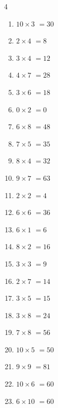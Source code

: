 \begin{multicols}{4}
\begin{enumerate}
  \item $10\times 3$
        $=30$

\columnbreak %

  \item $2\times 4$
        $=8$

  \item $3\times 4$
        $=12$

  \item $4\times 7$
        $=28$

  \item $3\times 6$
        $=18$

  \item $0\times 2$
        $=0$

  \item $6\times 8$
        $=48$

  \item $7\times 5$
        $=35$

  \item $8\times 4$
        $=32$

  \item $9\times 7$
        $=63$

  \item $2\times 2$
        $=4$

  \item $6\times 6$
        $=36$

  \item $6\times 1$
        $=6$

  \item $8\times 2$
        $=16$

  \item $3\times 3$
        $=9$

  \item $2\times 7$
        $=14$

  \item $3\times 5$
        $=15$

  \item $3\times 8$
        $=24$

  \item $7\times 8$
        $=56$

  \item $10\times 5$
        $=50$

  \item $9\times 9$
        $=81$

  \item $10\times 6$
        $=60$

  \item $6\times 10$
        $=60$


\end{enumerate}
\end{multicols}
